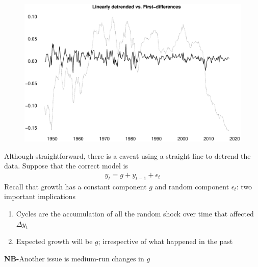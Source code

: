 \documentclass{beamer}
\begin{document}
\begin{frame}
  \begin{figure}
    \includegraphics[scale=.25]{first_differences.eps}
  \end{figure}
\end{frame}

\begin{frame}
 Although straightforward, there is a caveat using a straight line to detrend the data.
 Suppose that the correct model is
\begin{align}
 y_t = g+ y_{t-1} + \epsilon_t
\end{align}
\medskip
Recall that growth has a constant component $g$ and random component $\epsilon_t$: two important implications
\begin{enumerate}
  \item Cycles are the accumulation of all the random shock over time that affected $\Delta y_t$
  \item Expected growth will be $g$; irrespective of what happened in the past
\end{enumerate}
\medskip
\textbf{NB-}Another issue is medium-run changes in $g$
\end{frame}
\end{document}
